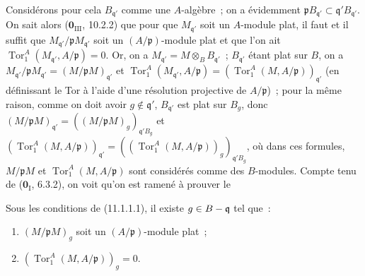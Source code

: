 Considérons pour cela $B_{\mathfrak q'}$ comme une $A$-algèbre~; on a
évidemment
$\mathfrak pB_{\mathfrak q'}\subset\mathfrak q'B_{\mathfrak q'}$. On sait
alors ($\mathbf 0_{\mathrm{III}}$, 10.2.2) que pour que $M_{\mathfrak q'}$ soit
un $A$-module plat, il faut et il suffit que
$M_{\mathfrak q'}/\mathfrak pM_{\mathfrak q'}$ soit un
$(A/\mathfrak p)$-module plat et que l'on ait
$\operatorname{Tor}_1^A(M_{\mathfrak q'},A/\mathfrak p)=0$. Or, on a
$M_{\mathfrak q'}=M\otimes_BB_{\mathfrak q'}$~; $B_{\mathfrak q'}$ étant plat
sur $B$, on a
$M_{\mathfrak q'}/\mathfrak pM_{\mathfrak q'}
  =(M/\mathfrak pM)_{\mathfrak q'}$
et
$\operatorname{Tor}_1^A(M_{\mathfrak q'},A/\mathfrak p)
  =(\operatorname{Tor}_1^A(M,A/\mathfrak p))_{\mathfrak q'}$
(en définissant le Tor à l'aide d'une résolution projective de
$A/\mathfrak p$)~; pour la même raison, comme on doit avoir
$g\notin\mathfrak q'$, $B_{\mathfrak q'}$ est plat sur $B_g$, donc
$(M/\mathfrak pM)_{\mathfrak q'}
  =((M/\mathfrak pM)_g)_{\mathfrak q'B_g}$
et
$(\operatorname{Tor}_1^A(M,A/\mathfrak p))_{\mathfrak q'}
  =((\operatorname{Tor}_1^A(M,A/\mathfrak p))_g)_{\mathfrak q'B_g}$,
où dans ces formules, $M/\mathfrak pM$ et
$\operatorname{Tor}_1^A(M,A/\mathfrak p)$ sont considérés comme des
$B$-modules. Compte tenu de ($\mathbf 0_{\mathrm I}$, 6.3.2), on voit qu'on
est ramené à prouver le

\begin{lemma}[11.1.1.2]
\label{IV.11.1.1.2-fr}
Sous les conditions de \textup{(11.1.1.1)}, il existe $g\in B-\mathfrak q$ tel que~:
\begin{enumerate}[label=\textup{(\roman*)}]
  \item $(M/\mathfrak pM)_g$ soit un $(A/\mathfrak p)$-module plat~;
  \item $(\operatorname{Tor}_1^A(M,A/\mathfrak p))_g=0$.
\end{enumerate}
\end{lemma}


